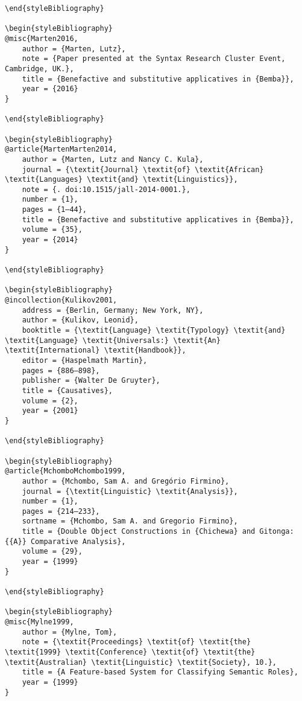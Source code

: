 \documentclass[output=paper]{langscibook}
\begin{document}
\begin{verbatim}
\end{styleBibliography}

\begin{styleBibliography}
@misc{Marten2016,
	author = {Marten, Lutz},
	note = {Paper presented at the Syntax Research Cluster Event, Cambridge, UK.},
	title = {Benefactive and substitutive applicatives in {Bemba}},
	year = {2016}
}

\end{styleBibliography}

\begin{styleBibliography}
@article{MartenMarten2014,
	author = {Marten, Lutz and Nancy C. Kula},
	journal = {\textit{Journal} \textit{of} \textit{African} \textit{Languages} \textit{and} \textit{Linguistics}},
	note = {. doi:10.1515/jall-2014-0001.},
	number = {1},
	pages = {1–44},
	title = {Benefactive and substitutive applicatives in {Bemba}},
	volume = {35},
	year = {2014}
}

\end{styleBibliography}

\begin{styleBibliography}
@incollection{Kulikov2001,
	address = {Berlin, Germany; New York, NY},
	author = {Kulikov, Leonid},
	booktitle = {\textit{Language} \textit{Typology} \textit{and} \textit{Language} \textit{Universals:} \textit{An} \textit{International} \textit{Handbook}},
	editor = {Haspelmath Martin},
	pages = {886–898},
	publisher = {Walter De Gruyter},
	title = {Causatives},
	volume = {2},
	year = {2001}
}

\end{styleBibliography}

\begin{styleBibliography}
@article{MchomboMchombo1999,
	author = {Mchombo, Sam A. and Gregório Firmino},
	journal = {\textit{Linguistic} \textit{Analysis}},
	number = {1},
	pages = {214–233},
	sortname = {Mchombo, Sam A. and Gregorio Firmino},
	title = {Double Object Constructions in {Chichewa} and Gitonga: {{A}} Comparative Analysis},
	volume = {29},
	year = {1999}
}

\end{styleBibliography}

\begin{styleBibliography}
@misc{Mylne1999,
	author = {Mylne, Tom},
	note = {\textit{Proceedings} \textit{of} \textit{the} \textit{1999} \textit{Conference} \textit{of} \textit{the} \textit{Australian} \textit{Linguistic} \textit{Society}, 10.},
	title = {A Feature-based System for Classifying Semantic Roles},
	year = {1999}
}


\end{verbatim}
\end{document}
